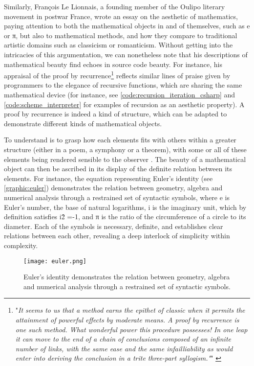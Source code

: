 Similarly, François Le Lionnais, a founding member of the Oulipo literary movement in postwar France, wrote an essay on the aesthetic of mathematics, paying attention to both the mathematical objects in and of themselves, such as e or π, but also to mathematical methods, and how they compare to traditional artistic domains such as classicism or romanticism. Without getting into the intricacies of this argumentation, we can nonetheless note that his descriptions of mathematical beauty find echoes in source code beauty. For instance, his appraisal of the proof by recurrence\footnote{"\emph{It seems to us that a method earns the epithet of classic when it permits the attainment of powerful effects by moderate means. A proof by recurrence is one such method. What wonderful power this procedure possesses! In one leap it can move to the end of a chain of conclusions composed of an infinite number of links, with the same ease and the same infailliability as would enter into deriving the conclusion in a trite three-part syllogism."}" \citep{lelionnais_great_1971}} reflects similar lines of praise given by programmers to the elegance of recursive functions, which are sharing the same mathematical device (for instance, see \autoref{code:recursion_iteration_csharp} and \autoref{code:scheme_interpreter} for examples of recursion as an aesthetic property). A proof by recurrence is indeed a kind of structure, which can be adapted to demonstrate different kinds of mathematical objects.

To understand is to grasp how each elements fits with others within a greater structure (either in a poem, a symphony or a theorem), with some or all of these elements being rendered sensible to the observer \citep{cellucci_mathematical_2015}. The beauty of a mathematical object can then be ascribed in its display of the definite relation between its elements. For instance, the equation representing Euler's identity (see \autoref{graphic:euler}) demonstrates the relation between geometry, algebra and numerical analysis through a restrained set of syntactic symbols, where e is Euler's number, the base of natural logarithms, i is the imaginary unit, which by definition satisfies i\^{2} =-1, and π is the ratio of the circumference of a circle to its diameter. Each of the symbols is necessary, definite, and establishes clear relations between each other, revealing a deep interlock of simplicity within complexity.

\begin{figure}
    \texttt{[image: euler.png]}
    \caption{Euler's identity demonstrates the relation between geometry, algebra and numerical analysis through a restrained set of syntactic symbols.}
    \label{graphic:euler}
\end{figure}


